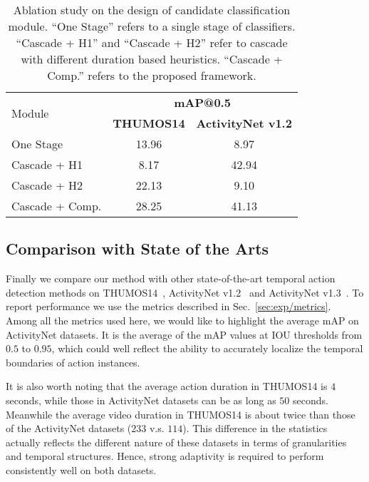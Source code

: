 \documentclass[10pt,twocolumn,letterpaper]{article}
\begin{document}
\begin{table}[t]
	\begin{center}
		\begin{tabular}{l|c|c}
			\hline
			\multirow{2}{*}{Module} & \multicolumn{2}{c}{\textbf{mAP@0.5}}                 \\ \cline{2-3} 
			                                     & \textbf{THUMOS14}              & \textbf{ActivityNet v1.2}     \\ \hline
			One Stage                    & 13.96                                     &  8.97            \\ \hline
			Cascade + H1                      & 8.17  & 42.94 \\ \hline Cascade + H2                      & 22.13                                    &                       9.10 \\ \hline 

			Cascade + Comp.                & 28.25                                     &           41.13  \\ \hline
		\end{tabular}
	\end{center}
	\caption{Ablation study on the design of candidate classification module. 
		``One Stage'' refers to a single stage of classifiers. 
		``Cascade + H1'' and ``Cascade + H2'' refer to cascade with different duration based heuristics.
		``Cascade + Comp.'' refers to the proposed framework.}
	\label{table:completeness}
\end{table}

\subsection{Comparison with State of the Arts}
Finally we compare our method with other state-of-the-art temporal action detection methods on THUMOS14~\cite{Jiang2014THUMOS14}, ActivityNet v1.2~\cite{caba2015activitynet} and ActivityNet v1.3~\cite{caba2015activitynet}.
To report performance we use the metrics described in Sec.~\ref{sec:exp/metrics}.
Among all the metrics used here, we would like to highlight the average mAP on ActivityNet datasets.
It is the average of the mAP values at IOU thresholds from $ 0.5 $ to $ 0.95 $, 
which could well reflect the ability to accurately localize the temporal boundaries of action instances.

It is also worth noting that the average action duration in THUMOS14 is $4$ seconds, while those in ActivityNet datasets can be as long as $50$ seconds.
Meanwhile the average video duration in THUMOS14 is about twice than those of the ActivityNet datasets ($ 233 $ v.s. $ 114 $).
This difference in the statistics actually reflects the different nature of these datasets in terms of granularities and temporal structures.
Hence, strong adaptivity is required to perform consistently well on both datasets.
\end{document}
